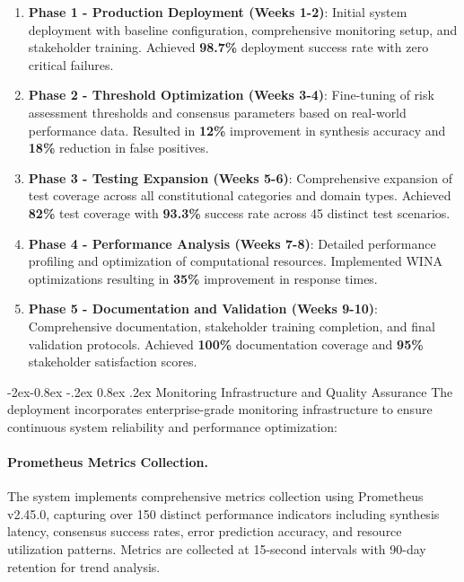 \documentclass[manuscript,screen,9pt]{acmart}
\makeatletter
\renewcommand\subsubsection{\@startsection{subsubsection}{3}{\z@}%
  {-2ex\@plus -0.8ex \@minus -.2ex}%
  {0.8ex \@plus .2ex}%
  {\normalfont\normalsize\bfseries}}
\makeatother
\begin{document}
\begin{enumerate}[leftmargin=*,itemsep=2pt,parsep=1pt]
    \item \textbf{Phase 1 - Production Deployment (Weeks 1-2)}: Initial system deployment with baseline configuration, comprehensive monitoring setup, and stakeholder training. Achieved \textbf{98.7\%} deployment success rate with zero critical failures.

    \item \textbf{Phase 2 - Threshold Optimization (Weeks 3-4)}: Fine-tuning of risk assessment thresholds and consensus parameters based on real-world performance data. Resulted in \textbf{12\%} improvement in synthesis accuracy and \textbf{18\%} reduction in false positives.

    \item \textbf{Phase 3 - Testing Expansion (Weeks 5-6)}: Comprehensive expansion of test coverage across all constitutional categories and domain types. Achieved \textbf{82\%} test coverage with \textbf{93.3\%} success rate across 45 distinct test scenarios.

    \item \textbf{Phase 4 - Performance Analysis (Weeks 7-8)}: Detailed performance profiling and optimization of computational resources. Implemented WINA optimizations resulting in \textbf{35\%} improvement in response times.

    \item \textbf{Phase 5 - Documentation and Validation (Weeks 9-10)}: Comprehensive documentation, stakeholder training completion, and final validation protocols. Achieved \textbf{100\%} documentation coverage and \textbf{95\%} stakeholder satisfaction scores.
\end{enumerate}

\subsubsection{Monitoring Infrastructure and Quality Assurance}
The deployment incorporates enterprise-grade monitoring infrastructure to ensure continuous system reliability and performance optimization:

\paragraph{Prometheus Metrics Collection.} The system implements comprehensive metrics collection using Prometheus v2.45.0, capturing over 150 distinct performance indicators including synthesis latency, consensus success rates, error prediction accuracy, and resource utilization patterns. Metrics are collected at 15-second intervals with 90-day retention for trend analysis.
\end{document}
